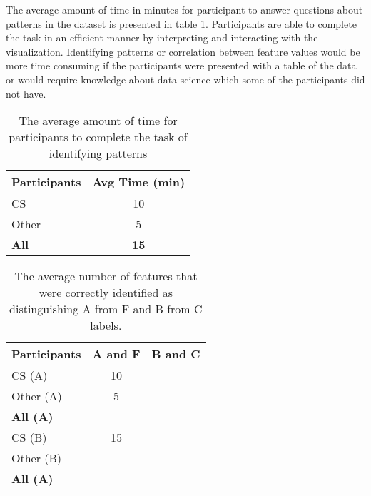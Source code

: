 The average amount of time in minutes for participant to answer questions about patterns in the dataset is presented in table \ref{AvgTimeIdentifyPattern}. Participants are able to complete the task in an efficient manner by interpreting and interacting with the visualization. Identifying patterns or correlation between feature values would be more time consuming if the participants were presented with a table of the data or would require knowledge about data science which some of the participants did not have.

\begin{table}[]
\centering
\begin{tabular}{lc}
\hline
Participants & Avg Time (min) \\ \hline
CS           & 10             \\
Other        & 5              \\ \hline
\textbf{All} & \textbf{15}    \\ \hline
\end{tabular}
\caption{The average amount of time for participants to complete the task of identifying patterns}
\label{AvgTimeIdentifyPattern}
\end{table}

\begin{table}[]
\centering
\begin{tabular}{lcc}
\hline
Participants & A and F & B and C \\ \hline
CS (A)       & 10      &         \\
Other (A)    & 5       &         \\
\textbf{All (A)} & \textbf{}        &  \textbf{}       \\ \hline
CS (B)       & 15      &         \\
Other (B)    &         &         \\
\textbf{All (A)} &   \textbf{} & \textbf{}        \\ \hline
\end{tabular}
\caption{The average number of features that were correctly identified as distinguishing A from F and B from C labels.}
\label{DistinguishingFeatures}
\end{table}


